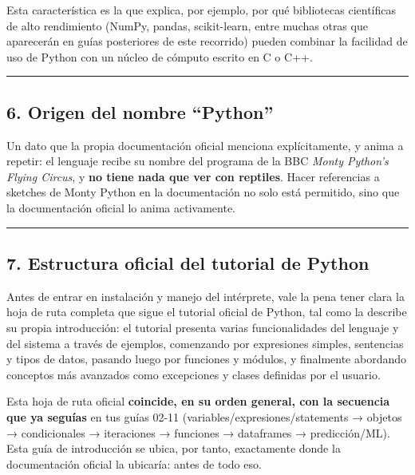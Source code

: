 \documentclass[
  doc,
  floatsintext,
  longtable,
  a4paper,
  nolmodern,
  notxfonts,
  notimes,
  12pt,
  colorlinks=true,linkcolor=blue,citecolor=blue,urlcolor=blue]{apa7}
\begin{document}
Esta característica es la que explica, por ejemplo, por qué bibliotecas
científicas de alto rendimiento (NumPy, pandas, scikit-learn, entre
muchas otras que aparecerán en guías posteriores de este recorrido)
pueden combinar la facilidad de uso de Python con un núcleo de cómputo
escrito en C o C++.

\begin{center}\rule{0.5\linewidth}{0.5pt}\end{center}

\subsection{6. Origen del nombre
``Python''}\label{origen-del-nombre-python}

Un dato que la propia documentación oficial menciona explícitamente, y
anima a repetir: el lenguaje recibe su nombre del programa de la BBC
\emph{Monty Python's Flying Circus}, y \textbf{no tiene nada que ver con
reptiles}. Hacer referencias a sketches de Monty Python en la
documentación no solo está permitido, sino que la documentación oficial
lo anima activamente.

\begin{center}\rule{0.5\linewidth}{0.5pt}\end{center}

\subsection{7. Estructura oficial del tutorial de
Python}\label{estructura-oficial-del-tutorial-de-python}

Antes de entrar en instalación y manejo del intérprete, vale la pena
tener clara la hoja de ruta completa que sigue el tutorial oficial de
Python, tal como la describe su propia introducción: el tutorial
presenta varias funcionalidades del lenguaje y del sistema a través de
ejemplos, comenzando por expresiones simples, sentencias y tipos de
datos, pasando luego por funciones y módulos, y finalmente abordando
conceptos más avanzados como excepciones y clases definidas por el
usuario.

Esta hoja de ruta oficial \textbf{coincide, en su orden general, con la
secuencia que ya seguías} en tus guías 02-11
(variables/expresiones/statements → objetos → condicionales →
iteraciones → funciones → dataframes → predicción/ML). Esta guía de
introducción se ubica, por tanto, exactamente donde la documentación
oficial la ubicaría: antes de todo eso.
\end{document}
